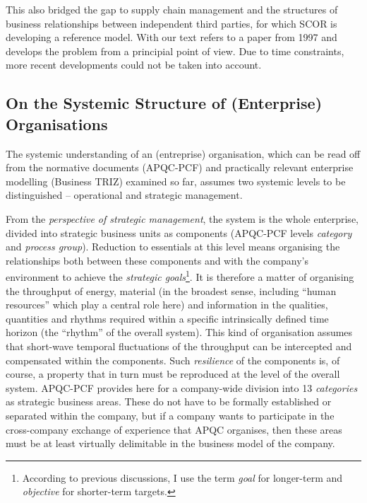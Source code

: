 \documentclass[11pt,a4paper]{article}
\begin{document}
This also bridged the gap to supply chain management and the structures of
business relationships between independent third parties, for which SCOR is
developing a reference model. With \cite{Stewart1997} our text refers to a
paper from 1997 and develops the problem from a principial point of view. Due
to time constraints, more recent developments could not be taken into account.

\subsection{On the Systemic Structure of (Enterprise) Organisations}

The systemic understanding of an (entreprise) organisation, which can be read
off from the normative documents (APQC-PCF) and practically relevant
enterprise modelling (Business TRIZ) examined so far, assumes two systemic
levels to be distinguished -- operational and strategic management.

From the \emph{perspective of strategic management}, the system is the whole
enterprise, divided into strategic business units as components (APQC-PCF
levels \emph{category} and \emph{process group}). Reduction to essentials at
this level means organising the relationships both between these components
and with the company's environment to achieve the \emph{strategic
  goals}\footnote{According to previous discussions, I use the term
  \emph{goal} for longer-term and \emph{objective} for shorter-term targets.}.
It is therefore a matter of organising the throughput of energy, material (in
the broadest sense, including \enquote{human resources} which play a central
role here) and information in the qualities, quantities and rhythms required
within a specific intrinsically defined time horizon (the \enquote{rhythm} of
the overall system). This kind of organisation assumes that short-wave
temporal fluctuations of the throughput can be intercepted and compensated
within the components. Such \emph{resilience} of the components is, of course,
a property that in turn must be reproduced at the level of the overall system.
APQC-PCF provides here for a company-wide division into 13 \emph{categories}
as strategic business areas. These do not have to be formally established or
separated within the company, but if a company wants to participate in the
cross-company exchange of experience that APQC organises, then these areas
must be at least virtually delimitable in the business model of the company.
\end{document}
